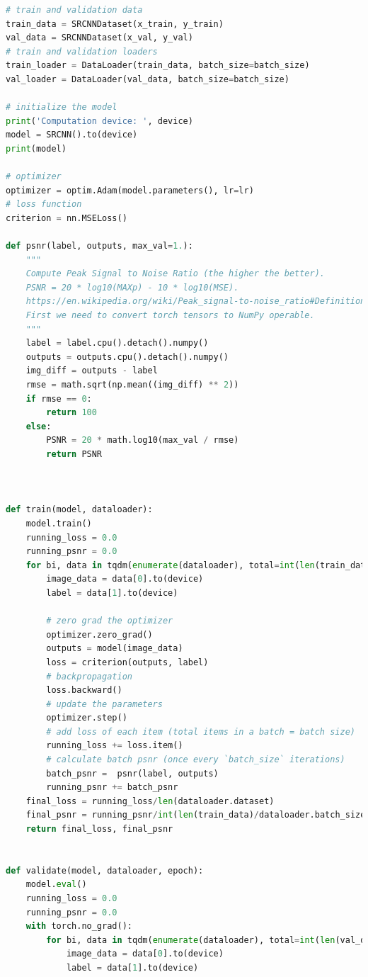 \documentclass[11pt,UTF8]{ctexart}
\begin{document}
\begin{lstlisting}[language={python}]
# train and validation data
train_data = SRCNNDataset(x_train, y_train)
val_data = SRCNNDataset(x_val, y_val)
# train and validation loaders
train_loader = DataLoader(train_data, batch_size=batch_size)
val_loader = DataLoader(val_data, batch_size=batch_size)

# initialize the model
print('Computation device: ', device)
model = SRCNN().to(device)
print(model)

# optimizer
optimizer = optim.Adam(model.parameters(), lr=lr)
# loss function 
criterion = nn.MSELoss()

def psnr(label, outputs, max_val=1.):
    """
    Compute Peak Signal to Noise Ratio (the higher the better).
    PSNR = 20 * log10(MAXp) - 10 * log10(MSE).
    https://en.wikipedia.org/wiki/Peak_signal-to-noise_ratio#Definition
    First we need to convert torch tensors to NumPy operable.
    """
    label = label.cpu().detach().numpy()
    outputs = outputs.cpu().detach().numpy()
    img_diff = outputs - label
    rmse = math.sqrt(np.mean((img_diff) ** 2))
    if rmse == 0:
        return 100
    else:
        PSNR = 20 * math.log10(max_val / rmse)
        return PSNR



def train(model, dataloader):
    model.train()
    running_loss = 0.0
    running_psnr = 0.0
    for bi, data in tqdm(enumerate(dataloader), total=int(len(train_data)/dataloader.batch_size)):
        image_data = data[0].to(device)
        label = data[1].to(device)
        
        # zero grad the optimizer
        optimizer.zero_grad()
        outputs = model(image_data)
        loss = criterion(outputs, label)
        # backpropagation
        loss.backward()
        # update the parameters
        optimizer.step()
        # add loss of each item (total items in a batch = batch size)
        running_loss += loss.item()
        # calculate batch psnr (once every `batch_size` iterations)
        batch_psnr =  psnr(label, outputs)
        running_psnr += batch_psnr
    final_loss = running_loss/len(dataloader.dataset)
    final_psnr = running_psnr/int(len(train_data)/dataloader.batch_size)
    return final_loss, final_psnr


def validate(model, dataloader, epoch):
    model.eval()
    running_loss = 0.0
    running_psnr = 0.0
    with torch.no_grad():
        for bi, data in tqdm(enumerate(dataloader), total=int(len(val_data)/dataloader.batch_size)):
            image_data = data[0].to(device)
            label = data[1].to(device)
            

\end{lstlisting}
\end{document}
